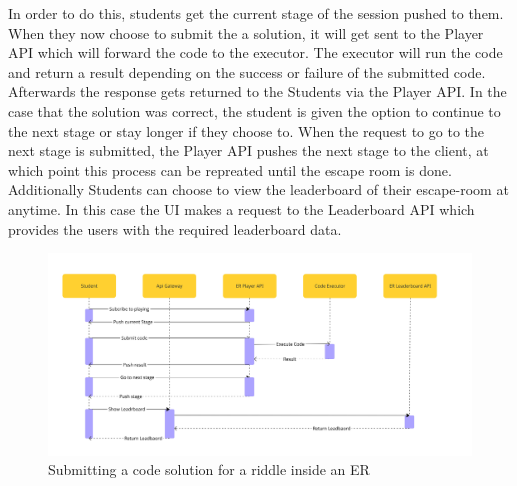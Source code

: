 In order to do this, students get the current stage of the session pushed to them. When they now choose to submit the a solution, it will get sent to the Player API which will forward the code to the executor. The executor will run the code and return a result depending on the success or failure of the submitted code. Afterwards the response gets returned to the Students via the Player API. In the case that the solution was correct, the student is given the option to continue to the next stage or stay longer if they choose to. When the request to go to the next stage is submitted, the Player API pushes the next stage to the client, at which point this process can be repreated until the escape room is done. \\
Additionally Students can choose to view the leaderboard of their escape-room at anytime. In this case the UI makes a request to the Leaderboard API which provides the users with the required leaderboard data.

\begin{figure}[h!]
    \centering
    \includegraphics[width=1\linewidth]{images/Sequence Diagrams/SEP1 - EscapeDOOM - Sequenzdiagramm - Play Escaperoom.jpg}
    \caption{Submitting a code solution for a riddle inside an ER}
    \label{fig:sequenceDiag:send_riddle_solution}
\end{figure}